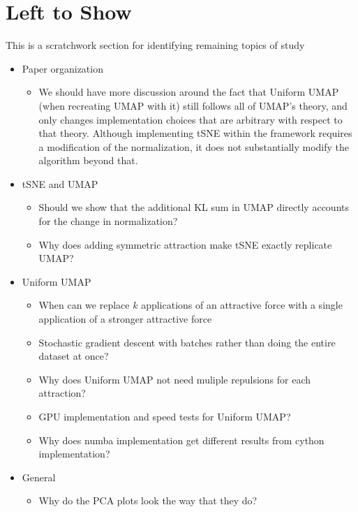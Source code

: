 \documentclass{article}
\theoremstyle{definition}
\begin{document}
\section{Left to Show}
This is a scratchwork section for identifying remaining topics of study
\begin{itemize}
    \item Paper organization
        \begin{itemize}
            \item We should have more discussion around the fact that Uniform UMAP (when recreating UMAP with it) still follows all of UMAP's theory, and only
                changes implementation choices that are arbitrary with respect to that theory. Although implementing tSNE within the framework requires
                a modification of the normalization, it does not substantially modify the algorithm beyond that.
        \end{itemize}
    \item tSNE and UMAP
        \begin{itemize}
            \item Should we show that the additional KL sum in UMAP directly accounts for the change in normalization?
            \item Why does adding symmetric attraction make tSNE exactly replicate UMAP?
        \end{itemize}
    \item Uniform UMAP
        \begin{itemize}
            \item When can we replace $k$ applications of an attractive force with a single application of a stronger attractive force
            \item Stochastic gradient descent with batches rather than doing the entire dataset at once?
            \item Why does Uniform UMAP not need muliple repulsions for each attraction?
            \item GPU implementation and speed tests for Uniform UMAP?
            \item Why does numba implementation get different results from cython implementation?
        \end{itemize}
    \item General
        \begin{itemize}
            \item Why do the PCA plots look the way that they do?
        \end{itemize}
\end{itemize}

\printbibliography
\end{document}
